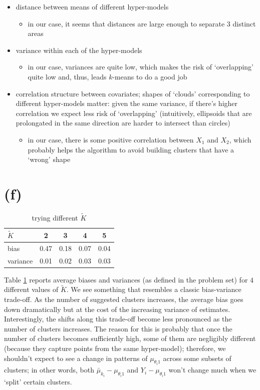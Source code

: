 \documentclass[a4paper,12pt,twoside]{article}
\begin{document}
\begin{itemize}
  \item distance between means of different hyper-models
	\begin{itemize}
\item in our case, it seems that distances are large enough to separate $3$
distinct areas
	\end{itemize}
  \item variance within each of the hyper-models
	\begin{itemize}
\item in our case, variances are quite low, which makes the risk of
`overlapping' quite low and, thus, leads $k$-means to do a good job
	\end{itemize}
\item correlation structure between covariates; shapes of `clouds'
corresponding to different hyper-models matter: given the same variance, if
there's higher correlation we expect less risk of `overlapping' (intuitively,
ellipsoids that are prolongated in the same direction are harder to intersect
than circles)
	\begin{itemize}
\item in our case, there is some positive correlation between $X_1$ and $X_2$,
which probably helps the algorithm to avoid building clusters that have a
`wrong' shape
	\end{itemize}
\end{itemize}


\section*{(f)}

\begin{table}[h]
\centering
\caption{trying different \( \tilde K \)}
\label{tab:k_tilde}
\begin{tabular}{lcccc}
\toprule
\( \tilde K \) & 2 & 3 & 4 & 5 \\ 
  \midrule
bias & 0.47 & 0.18 & 0.07 & 0.04 \\ 
variance & 0.01 & 0.02 & 0.03 & 0.03 \\ 
\bottomrule
\end{tabular}
\end{table}

Table \ref{tab:k_tilde} reports average biases and variances (as defined in the
problem set) for \( 4 \) different values of $\tilde K$. We see something that
resembles a classic bias-variance trade-off. As the number of suggested
clusters increases, the average bias goes down dramatically but at the cost of
the increasing variance of estimates. Interestingly, the shifts along this
trade-off become less pronounced as the number of clusters increases. The
reason for this is probably that once the number of clusters becomes
sufficiently high, some of them are negligibly different (because they capture
points from the same hyper-model); therefore, we shouldn't expect to see a
change in patterns of $ \mu_{\theta_i 1}$ across some subsets of clusters; in
other words, both $\bar \mu_{k_i} - \mu_{\theta_i 1}$ and $Y_i - \mu_{\theta_i
1}$ won't change much when we `split' certain clusters.
\end{document}
